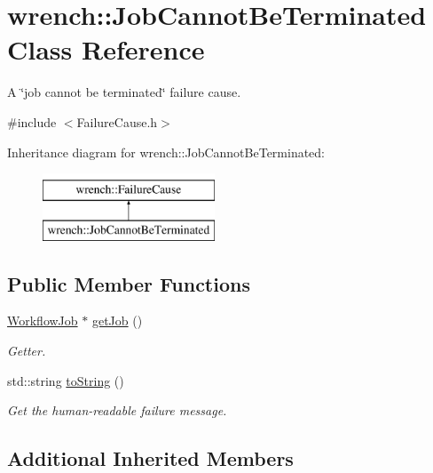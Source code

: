 \hypertarget{classwrench_1_1_job_cannot_be_terminated}{}\section{wrench\+:\+:Job\+Cannot\+Be\+Terminated Class Reference}
\label{classwrench_1_1_job_cannot_be_terminated}


A \char`\"{}job cannot be terminated\char`\"{} failure cause.  




{\ttfamily \#include $<$Failure\+Cause.\+h$>$}

Inheritance diagram for wrench\+:\+:Job\+Cannot\+Be\+Terminated\+:\begin{figure}[H]
\begin{center}
\leavevmode
\includegraphics[height=2.000000cm]{classwrench_1_1_job_cannot_be_terminated}
\end{center}
\end{figure}
\subsection*{Public Member Functions}
\begin{DoxyCompactItemize}
\item 
\hyperlink{classwrench_1_1_workflow_job}{Workflow\+Job} $\ast$ \hyperlink{classwrench_1_1_job_cannot_be_terminated_af97232722e1b4feed0c12b9e0ced666f}{get\+Job} ()
\begin{DoxyCompactList}\small\item\em Getter. \end{DoxyCompactList}\item 
std\+::string \hyperlink{classwrench_1_1_job_cannot_be_terminated_acfa2b83db93bb68e0e773cc8b4a45505}{to\+String} ()
\begin{DoxyCompactList}\small\item\em Get the human-\/readable failure message. \end{DoxyCompactList}\end{DoxyCompactItemize}
\subsection*{Additional Inherited Members}


